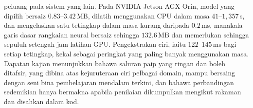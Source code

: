 peluang pada sistem yang lain. Pada NVIDIA Jetson AGX Orin, model yang dipilih bersaiz $0.83$--$3.42$\,MB, dilatih menggunakan CPU dalam masa $41$--$1{,}357$\,s, dan mengelaskan satu tetingkap dalam masa kurang daripada $0.2$\,ms, manakala garis dasar rangkaian neural bersaiz sehingga $132.6$\,MB dan memerlukan sehingga sepuluh setengah jam latihan GPU. Pengekstrakan ciri, iaitu $122$--$145$\,ms bagi setiap tetingkap, kekal sebagai peringkat yang paling banyak menggunakan masa. Dapatan kajian menunjukkan bahawa saluran paip yang ringan dan boleh ditafsir, yang dibina atas kejuruteraan ciri pelbagai domain, mampu bersaing dengan seni bina pembelajaran mendalam terkini, dan bahawa perbandingan sedemikian hanya bermakna apabila penilaian dikumpulkan mengikut rakaman dan disahkan dalam kod.
